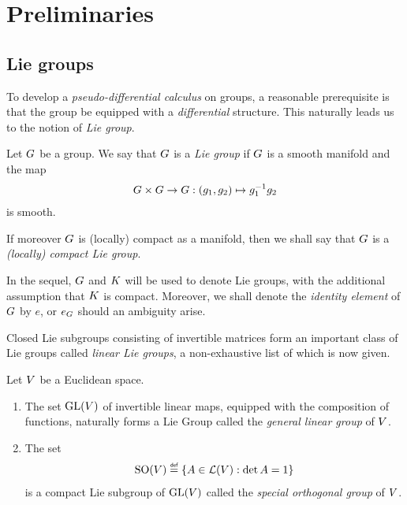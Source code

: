 \chapter{Preliminaries}
\label{chapter:preliminaries}

\section{Lie groups}

To develop a \emph{pseudo-differential calculus} on groups,
a reasonable prerequisite is that the group be equipped with a \emph{differential} structure.
This naturally leads us to the notion of \emph{Lie group}.

\begin{definition}
\label{definition:Lie_group}
    Let $G$ be a group.
    We say that $G$ is a \emph{Lie group}
    if $G$ is a smooth manifold and the map
    \begin{align*}
        G \times G \to G :
        (g_1, g_2) \mapsto g_1^{-1} g_2
    \end{align*}
    is smooth.

    If moreover $G$ is (locally) compact as a manifold,
    then we shall say that $G$ is a \emph{(locally) compact Lie group}.
\end{definition}

In the sequel,
$G$ and $K$ will be used to denote Lie groups,
with the additional assumption that $K$ is compact.
Moreover, we shall denote the \emph{identity element} of $G$ by $e$,
or $e_G$ should an ambiguity arise.

Closed Lie subgroups consisting of invertible matrices form an important class of Lie groups called \emph{linear Lie groups},
a non-exhaustive list of which is now given.

\begin{example}
    Let $V$ be a Euclidean space.
    \begin{enumerate}
        \item The set $\mathrm{GL}(V)$ of invertible linear maps,
            equipped with the composition of functions,
            naturally forms a Lie Group called the \emph{general linear group} of $V$.
        \item The set
            \begin{align*}
                \SpecialOrthogonalGroup \VectorSpace
                \defeq
                \{ A \in \Lin{\VectorSpace} : \det A = 1 \}
            \end{align*}
            is a compact Lie subgroup of $\mathrm{GL}(V)$
            called the \emph{special orthogonal group} of $V$.
    \end{enumerate}
\end{example}

